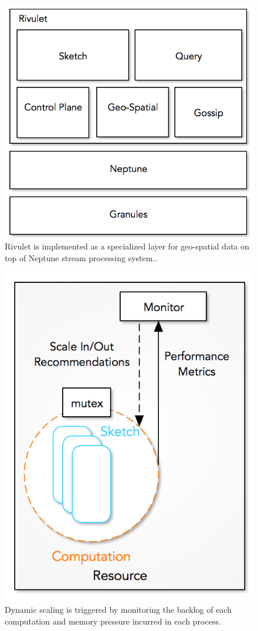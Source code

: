 \begin{figure}
    \centerline{\includegraphics[scale=0.5]{figures/rivulet-archi.png}}
    \caption{Rivulet is implemented as a specialized layer for geo-spatial data on top of Neptune stream processing system..}
    \label{fig:process-monitor}
\end{figure}
%
\begin{figure}
    \centerline{\includegraphics[scale=0.55]{figures/process-monitor.png}}
    \caption{Dynamic scaling is triggered by monitoring the backlog of each computation and memory pressure incurred in each process.}
    \label{fig:process-monitor}
\end{figure}